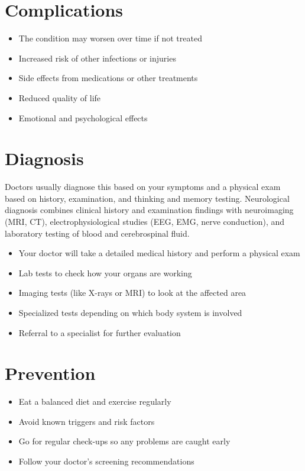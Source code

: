 \section{Complications}

\begin{itemize}[noitemsep]
  \item The condition may worsen over time if not treated
  \item Increased risk of other infections or injuries
  \item Side effects from medications or other treatments
  \item Reduced quality of life
  \item Emotional and psychological effects
\end{itemize}

\section{Diagnosis}
Doctors usually diagnose this based on your symptoms and a physical exam based on history, examination, and thinking and memory testing. Neurological diagnosis combines clinical history and examination findings with neuroimaging (MRI, CT), electrophysiological studies (EEG, EMG, nerve conduction), and laboratory testing of blood and cerebrospinal fluid.

\begin{itemize}[noitemsep]
  \item Your doctor will take a detailed medical history and perform a physical exam
  \item Lab tests to check how your organs are working
  \item Imaging tests (like X-rays or MRI) to look at the affected area
  \item Specialized tests depending on which body system is involved
  \item Referral to a specialist for further evaluation
\end{itemize}

\section{Prevention}

\begin{itemize}[noitemsep]
  \item Eat a balanced diet and exercise regularly
  \item Avoid known triggers and risk factors
  \item Go for regular check-ups so any problems are caught early
  \item Follow your doctor's screening recommendations
\end{itemize}

